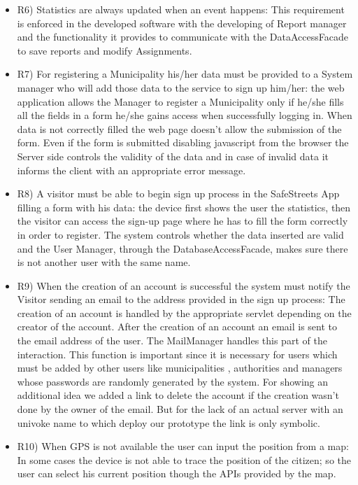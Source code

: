 \begin{itemize}
\item  R6) Statistics are always updated when an event happens: This requirement is enforced in the developed software with the 
developing of Report manager and the functionality it provides to communicate with the DataAccessFacade to save reports and 
modify Assignments.

\item  R7) For registering a Municipality his/her data must be provided to a System manager who will
add those data to the service to sign up him/her: the web application allows the Manager to register a Municipality only if he/she
fills all the fields in a form he/she gains access when successfully logging in. When data is not correctly filled the web page doesn't
allow the submission of the form. Even if the form is submitted disabling javascript from the browser the Server side controls the 
validity of the data and in case of invalid data it informs the client with an appropriate error message.

\item R8) A visitor must be able to begin sign up process in the SafeStreets App filling a form with his data: the device first shows the user the statistics, then the visitor can access the sign-up page where he has to fill the form correctly in order to register. The system controls whether the data inserted are valid and the User Manager, through the DatabaseAccessFacade, makes sure there is not another user with the same name.

\item  R9) When the creation of an account is successful the system must notify the Visitor sending an
email to the address provided in the sign up process: The creation of an account is handled by the appropriate servlet depending on the creator of the account. After the creation of an account an email is sent to the email address of the user. The MailManager
handles this part of the interaction. This function is important since it is necessary for users which must be added by other users like municipalities , authorities and managers whose passwords are randomly generated by the system.
For showing an additional idea we added a link to delete the account if the creation wasn't done by the owner of the email.
But for the lack of an actual server with an univoke name to which deploy our prototype the link is only symbolic.


\item  R10) When GPS is not available the user can input the position from a map: 
In some cases the device is not able to trace the position of the citizen; so the user can select his current position though the APIs provided by the map.


\end{itemize}
